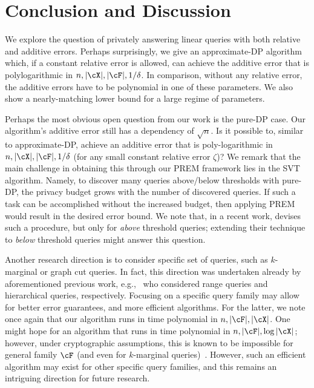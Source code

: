 \section{Conclusion and Discussion} \label{sec:discussion}

We explore the question of privately answering linear queries with both relative and additive errors. Perhaps surprisingly, we give an approximate-DP algorithm which, if a constant relative error is allowed, can achieve the additive error that is polylogarithmic in $n, |\cX|, |\cF|, 1/\delta$. In comparison, without any relative error, the additive errors have to be polynomial in one of these parameters. We also show a nearly-matching lower bound for a large regime of parameters.

Perhaps the most obvious open question from our work is the pure-DP case. Our algorithm's additive error still has a dependency of $\sqrt{n}$. Is it possible to, similar to approximate-DP, achieve an additive error that is poly-logarithmic in $n, |\cX|, |\cF|, 1/\delta$ (for any small constant relative error $\zeta$)? We remark that the main challenge in obtaining this through our PREM framework lies in the SVT algorithm. Namely, to discover many queries above/below thresholds with pure-DP, the privacy budget grows with the number of discovered queries. 
If such a task can be accomplished without the increased budget, then applying PREM would result in the desired error bound. We note that, in a recent work, \cite{GhaziKRMS24} devises such a procedure, but only for \emph{above} threshold queries; extending their technique to \emph{below} threshold queries might answer this question.

Another research direction is to consider specific set of queries, such as $k$-marginal or graph cut queries. In fact, this direction was undertaken already by aforementioned previous work, e.g.,~\cite{EpastoMMMVZ23,Ghazi:2023} who considered range queries and hierarchical queries, respectively. Focusing on a specific query family may allow for better error guarantees, and more efficient algorithms. For the latter, we note once again that our algorithm runs in time polynomial in $n, |\cF|, |\cX|$. 
One might hope for an algorithm that runs in time polynomial in $n, |\cF|, \log|\cX|$; however, under cryptographic assumptions, this is known to be impossible for general family $\cF$ (and even for $k$-marginal queries)~\citep{UllmanV20}. However, such an efficient algorithm may exist for other specific query families, and this remains an intriguing direction for future research.

